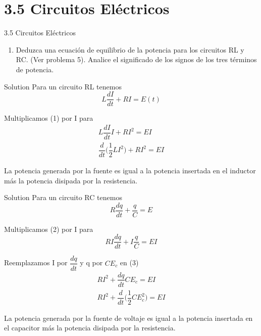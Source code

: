 \documentclass[10 pt]{beamer}
\begin{document}
\setcounter{equation}{0}

\section{3.5 Circuitos Eléctricos}
\begin{frame}{3.5 Circuitos Eléctricos}
    \begin{enumerate}[{6}]
        \item Deduzca una ecuación de equilibrio de la potencia para los circuitos RL y RC. (Ver problema 5). Analice el significado de los signos de los tres términos de potencia.
    \end{enumerate}
    \begin{block}{Solution}
        Para un circuito RL tenemos
        \begin{equation}
            L \dfrac{dI}{dt} + RI = E(t)
        \end{equation}

        Multiplicamos (1) por I para
        \begin{align*}
            L \dfrac{dI}{dt}I + RI^2 = EI \\
            \dfrac{d}{dt} \bigg( \dfrac{1}{2} LI^2 \bigg) + RI^2 = EI
        \end{align*}

        La potencia generada por la fuente es igual a la potencia insertada en el inductor más la potencia disipada por la resistencia.
    \end{block}
\end{frame}

\begin{frame}
    \begin{block}{Solution}
        Para un circuito RC tenemos
        \begin{equation}
            R \dfrac{dq}{dt} + \dfrac{q}{C} = E
        \end{equation}

        Multiplicamos (2) por I para
        \begin{equation}
            RI \dfrac{dq}{dt} + I \dfrac{q}{C}= EI
        \end{equation}

        Reemplazamos I por $\dfrac{dq}{dt}$ y q por $CE_c$ en (3)
        \begin{align*}
            RI^2 + \dfrac{dq}{dt} CE_c = EI \\
            RI^2 + \dfrac{d}{dt} \bigg (\dfrac{1}{2} CE_c^2 \bigg) = EI
        \end{align*}

        La potencia generada por la fuente de voltaje es igual a la potencia insertada en el capacitor más la potencia disipada por la resistencia.
    \end{block}
\end{frame}
\end{document}
